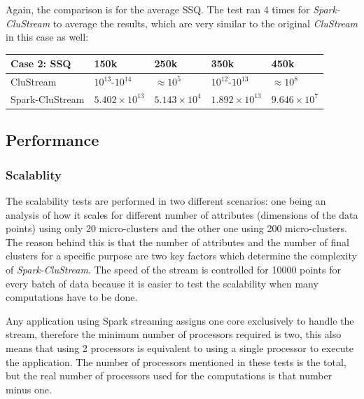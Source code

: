 \documentclass[10pt, conference, compsocconf]{IEEEtran}
\begin{document}
Again, the comparison is for the average SSQ. The test ran 4 times for \textit{Spark-CluStream} to average the results, which are very similar to the original \textit{CluStream} in this case as well:

\begin{center}
\begin{tabular}{|l|l|l|l|l|}\hline
\textbf{Case 2: SSQ} & \textbf{150k} & \textbf{250k} & \textbf{350k} & \textbf{450k}\\\hline
CluStream & $10^{13}$-$10^{14}$ & $\approx 10^{5}$ & $10^{12}$-$10^{13}$ & $\approx 10^{8}$\\\hline
Spark-CluStream & $5.402\times10^{13}$ & $5.143\times10^{4}$ & $1.892\times10^{13}$ & $9.646\times10^7$\\\hline
\end{tabular}
\end{center}


\subsection{Performance}


\subsubsection{Scalablity}

The scalability tests are performed in two different scenarios: one being an analysis of how it scales for different number of attributes (dimensions of the data points) using only 20 micro-clusters and the other one using 200 micro-clusters. The reason behind this is that the number of attributes and the number of final clusters for a specific purpose are two key factors which determine the complexity of \textit{Spark-CluStream}. The speed of the stream is controlled for 10000 points for every batch of data because it is easier to test the scalability when many computations have to be done.

Any application using Spark streaming assigns one core exclusively to handle the stream, therefore the minimum number of processors required is two, this also means that using 2 processors is equivalent to using a single processor to execute the application. The number of processors mentioned in these tests is the total, but the real number of processors used for the computations is that number minus one.
\end{document}

